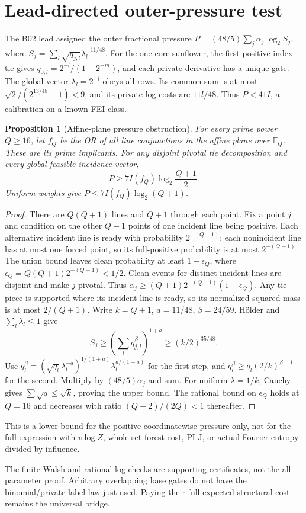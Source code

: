 \documentclass[11pt]{article}
\newtheorem{proposition}{Proposition}
\begin{document}
\section*{Lead-directed outer-pressure test}
The B02 lead assigned the outer fractional pressure
$P=(48/5)\sum_j\alpha_j\log_2 S_j$, where
$S_j=\sum_l\sqrt{q_{j,l}}\lambda_l^{-11/48}$.
For the one-core sunflower, the first-positive-index tie gives
$q_{0,l}=2^{-l}/(1-2^{-m})$, and each private derivative has a
unique gate. The global vector $\lambda_l=2^{-l}$ obeys all rows.
Its common sum is at most $\sqrt2/(2^{13/48}-1)<9$, and its private
log costs are $11l/48$. Thus $P<41I$, a calibration on a known FEI class.

\begin{proposition}[Affine-plane pressure obstruction]
For every prime power $Q\ge16$, let $f_Q$ be the OR of all line
conjunctions in the affine plane over $\mathbb F_Q$. These are its
prime implicants. For any disjoint pivotal tie decomposition and every
global feasible incidence vector,
\[
 P\ge7 I(f_Q)\log_2\frac{Q+1}{2}.
\]
Uniform weights give $P\le7I(f_Q)\log_2(Q+1)$.
\end{proposition}
\begin{proof}
There are $Q(Q+1)$ lines and $Q+1$ through each point. Fix a point $j$
and condition on the other $Q-1$ points of one incident line being
positive. Each alternative incident line is ready with probability
$2^{-(Q-1)}$; each nonincident line has at most one forced point,
so its full-positive probability is at most $2^{-(Q-1)}$.
The union bound leaves clean probability at least $1-\epsilon_Q$,
where $\epsilon_Q=Q(Q+1)2^{-(Q-1)}<1/2$.
Clean events for distinct incident lines are disjoint and make $j$
pivotal. Thus $\alpha_j\ge(Q+1)2^{-(Q-1)}(1-\epsilon_Q)$.
Any tie piece is supported where its incident line is ready, so its
normalized squared mass is at most $2/(Q+1)$.
Write $k=Q+1$, $a=11/48$, $\beta=24/59$.
H\"older and $\sum_l\lambda_l\le1$ give
\[
 S_j\ge\left(\sum_l q_{j,l}^{\beta}\right)^{1+a}
 \ge(k/2)^{35/48}.
\]
Use $q_l^\beta=(\sqrt{q_l}\lambda_l^{-a})^{1/(1+a)}
\lambda_l^{a/(1+a)}$ for the first step, and
$q_l^\beta\ge q_l(2/k)^{\beta-1}$ for the second.
Multiply by $(48/5)\alpha_j$ and sum. For uniform $\lambda=1/k$,
Cauchy gives $\sum\sqrt q\le\sqrt k$, proving the upper bound.
The rational bound on $\epsilon_Q$ holds at $Q=16$ and decreases
with ratio $(Q+2)/(2Q)<1$ thereafter.
\end{proof}
This is a lower bound for the positive coordinatewise pressure only,
not for the full expression with $v\log Z$, whole-set forest cost,
PI-J, or actual Fourier entropy divided by influence.

The finite Walsh and rational-log checks are supporting certificates,
not the all-parameter proof. Arbitrary overlapping base gates do not
have the binomial/private-label law just used. Paying their full
expected structural cost remains the universal bridge.
\end{document}

